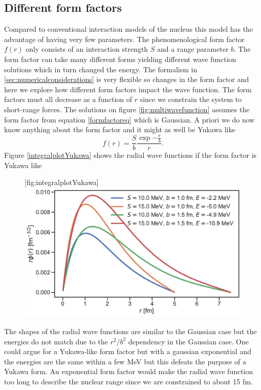 \subsection{Different form factors}
Compared to conventional interaction models of the nucleus this model has the advantage of having very few parameters. The phenomenological form factor $f(r)$ only consists of an interaction strength $S$ and a range parameter $b$. The form factor can take many different forms yielding different wave function solutions which in turn changed the energy. The formalism in \ref{sec:numericalconsiderations} is very flexible so changes in the form factor and here we explore how different form factors impact the wave function. The form factors must all decrease as a function of $r$ since we constrain the system to short-range forces. The solutions on figure \ref{fig:multiwavefunction} assumes the form factor from equation \ref{formfactoreq} which is Gaussian. A priori we do now know anything about the form factor and it might as well be Yukawa like
\begin{equation}\label{YukawaForm}
	f(r) = \frac{S}{b}\frac{\exp{-\frac{r}{b}}}{r}.
\end{equation}
Figure \ref{integralplotYukawa} shows the radial wave functions if the form factor is Yukawa like
\begin{figure}[H]
	\begin{sidecaption}{}[fig:integralplotYukawa]
		\includegraphics[width=\linewidth]{Figures/multiwavefunctionYukawa.pdf}
	\end{sidecaption}
\end{figure}
The shapes of the radial wave functions are similar to the Gaussian case but the energies do not match due to the $r^2/b^2$ dependency in the Gaussian case. One could argue for a Yukawa-like form factor but with a gaussian exponential and the energies are the same within a few MeV but this defeats the purpose of a Yukawa form. An exponential form factor would make the radial wave function too long to describe the nuclear range since we are constrained to about 15 fm.  
